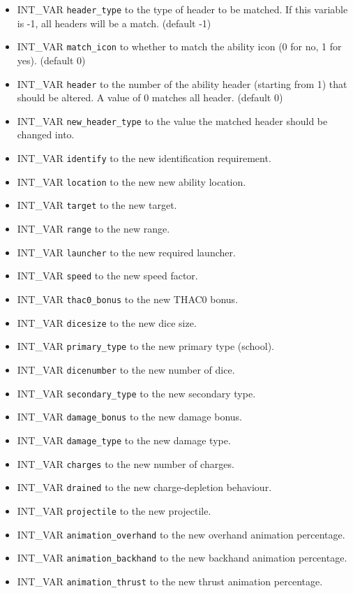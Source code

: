 \documentclass{article}
\begin{document}
\begin{itemize}
\item INT_VAR \verb+header_type+ to the type of header to be matched. If this variable is -1, all headers will be a match. (default -1)
\item INT_VAR \verb+match_icon+ to whether to match the ability icon (0 for no, 1 for yes). (default 0)
\item INT_VAR \verb+header+ to the number of the ability header (starting from 1) that should be altered. A value of 0 matches all header. (default 0)
\item INT_VAR \verb+new_header_type+ to the value the matched header should be changed into.
\item INT_VAR \verb+identify+ to the new identification requirement.
\item INT_VAR \verb+location+ to the new new ability location.
\item INT_VAR \verb+target+ to the new target.
\item INT_VAR \verb+range+ to the new range.
\item INT_VAR \verb+launcher+ to the new required launcher.
\item INT_VAR \verb+speed+ to the new speed factor.
\item INT_VAR \verb+thac0_bonus+ to the new THAC0 bonus.
\item INT_VAR \verb+dicesize+ to the new dice size.
\item INT_VAR \verb+primary_type+ to the new primary type (school).
\item INT_VAR \verb+dicenumber+ to the new number of dice.
\item INT_VAR \verb+secondary_type+ to the new secondary type.
\item INT_VAR \verb+damage_bonus+ to the new damage bonus.
\item INT_VAR \verb+damage_type+ to the new damage type.
\item INT_VAR \verb+charges+ to the new number of charges.
\item INT_VAR \verb+drained+ to the new charge-depletion behaviour.
\item INT_VAR \verb+projectile+ to the new projectile.
\item INT_VAR \verb+animation_overhand+ to the new overhand animation percentage.
\item INT_VAR \verb+animation_backhand+ to the new backhand animation percentage.
\item INT_VAR \verb+animation_thrust+ to the new thrust animation percentage.

\end{itemize}
\end{document}
